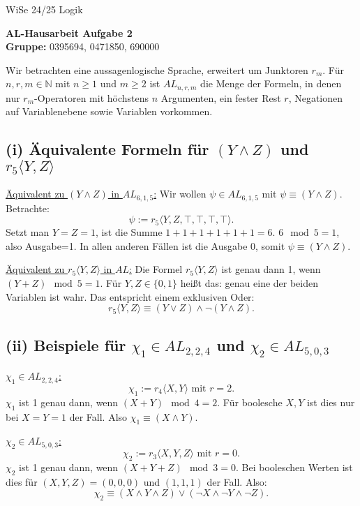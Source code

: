 \documentclass[12pt,a4paper]{article}
\begin{document}
\noindent
\noindent \large WiSe 24/25 \hfill
Logik

\begin{center}
\textbf{AL-Hausarbeit  Aufgabe 2}\\
\vspace*{0.5cm}
\textbf{Gruppe:} 0395694, 0471850, 690000 %

\end{center}

Wir betrachten eine aussagenlogische Sprache, erweitert um Junktoren $r_m$. Für $n,r,m \in \mathbb{N}$ mit $n \ge 1$ und $m \ge 2$ ist $AL_{n,r,m}$ die Menge der Formeln, in denen nur $r_m$-Operatoren mit höchstens $n$ Argumenten, ein fester Rest $r$, Negationen auf Variablenebene sowie Variablen vorkommen.

\subsection*{(i) Äquivalente Formeln für $(Y \land Z)$ und $r_5 \langle Y, Z \rangle$}

\underline{Äquivalent zu $(Y \land Z)$ in $AL_{6,1,5}$:}  
Wir wollen $\psi \in AL_{6,1,5}$ mit $\psi \equiv (Y \land Z)$.  
Betrachte:
\[
\psi := r_5\langle Y, Z, \top, \top, \top, \top \rangle.
\]
Setzt man $Y=Z=1$, ist die Summe $1+1+1+1+1+1=6$. $6 \mod 5=1$, also Ausgabe=1. In allen anderen Fällen ist die Ausgabe 0, somit $\psi \equiv (Y \land Z)$.

\underline{Äquivalent zu $r_5\langle Y,Z \rangle$ in $AL$:}  
Die Formel $r_5\langle Y,Z \rangle$ ist genau dann 1, wenn $(Y+Z)\mod 5=1$. Für $Y,Z \in \{0,1\}$ heißt das: genau eine der beiden Variablen ist wahr. Das entspricht einem exklusiven Oder:
\[
r_5\langle Y,Z\rangle \equiv (Y \lor Z) \land \neg(Y \land Z).
\]

\subsection*{(ii) Beispiele für $\chi_1 \in AL_{2,2,4}$ und $\chi_2 \in AL_{5,0,3}$}

\underline{$\chi_1 \in AL_{2,2,4}$:}  
\[
\chi_1 := r_4\langle X,Y \rangle \text{ mit } r=2.
\]
$\chi_1$ ist 1 genau dann, wenn $(X+Y) \mod4=2$. Für boolesche $X,Y$ ist dies nur bei $X=Y=1$ der Fall.  
Also $\chi_1 \equiv (X \land Y)$.

\underline{$\chi_2 \in AL_{5,0,3}$:}  
\[
\chi_2 := r_3\langle X,Y,Z \rangle \text{ mit } r=0.
\]
$\chi_2$ ist 1 genau dann, wenn $(X+Y+Z)\mod 3=0$. Bei booleschen Werten ist dies für $(X,Y,Z)=(0,0,0)$ und $(1,1,1)$ der Fall. Also:
\[
\chi_2 \equiv (X \land Y \land Z) \lor (\neg X \land \neg Y \land \neg Z).
\]
\end{document}
